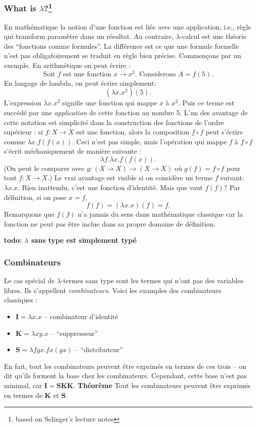 \documentclass[12pt, a4paper]{article}
\begin{document}
\subsubsection*{What is $\lambda$?\footnote{based on Selinger's lecture notes}}
En mathématique la notion d'une fonction est liée avec une application, i.e., règle qui transform paramètre dans un résultat.
Au contraire, $\lambda$-calcul est une théorie des ``fonctions comme formules''. La différence est ce que une formule formelle n'est pas obligatoirement se traduit en règle bien précise.
Commençons par un exemple.
En arithmétique on peut écrire : 
$$\text{Soit $f$ est une fonction $x \to x^2$. Considerons $A = f(5)$.}$$
En langage de lambda, on peut écrire simplement: $$(\lambda x.x^2) (5).$$
L'expression $\lambda x.x^2$ signifie une fonction qui mappe $x$ à $x^2$.
Puis ce terme est succédé par une \emph{application} de cette fonction au nombre 5.
L'un des avantage de cette notation est simplicité dans la construction des fonctions de l'ordre supérieur : si $f: X \to X$ est une fonction, alors la composition $f \circ f$ peut s'écrire comme $\lambda x.f(f(x))$.
Ceci n'est pas simple, mais l'opération qui mappe $f$ à $f \circ f$ s'écrit méchaniquement de manière suivante :
$$\lambda f. \lambda x.f(f(x)).$$
(On peut le comparer avec $g: (X \to X) \to (X \to X)$ où $g(f) = f \circ f$ pour tout $f: X \to X$.)
Le vrai avantage est visible si on considère un terme $f$ suivant: $\lambda x.x$.
Rien inattendu, c'est une fonction d'identité.
Mais que vaut $f(f)$?
Par définition, si on pose $x = f$,
$$f(f) = (\lambda x.x)(f) = f.$$
Remarquons que $f(f)$ n'a jamais du sens dans mathématique classique car la fonction ne peut pas être inclue dans sa propre domaine de définition.

\textbf{todo: $\lambda$ sans type est simplement typé}

\subsubsection*{Combinateurs}
Le cas spécial de $\lambda$-termes sans type sont les termes qui n'ont pas des variables libres. Ils s'appellent \emph{combinateurs}.
Voici les examples des combinateurs classiques :
\begin{itemize}
	\item $\mathbf{I} = \lambda x. x$ -- combinateur d'identité
	\item $\mathbf{K} = \lambda x y. x$ -- ``suppresseur''
	\item $\mathbf{S} = \lambda fgx. fx(gx)$ -- ``distributeur''
\end{itemize}
En fait, tout les combinateurs peuvent être exprimés en termes de ces trois -- on dit qu'ils forment la base chez les combinateurs.
Cependant, cette base n'est pas minimal, car $\mathbf{I} = \mathbf{SKK}$.
\textbf{Théorème} Tout les combinateurs peuvent être exprimés en termes de $\mathbf{K}$ et $\mathbf{S}$.
\end{document}
